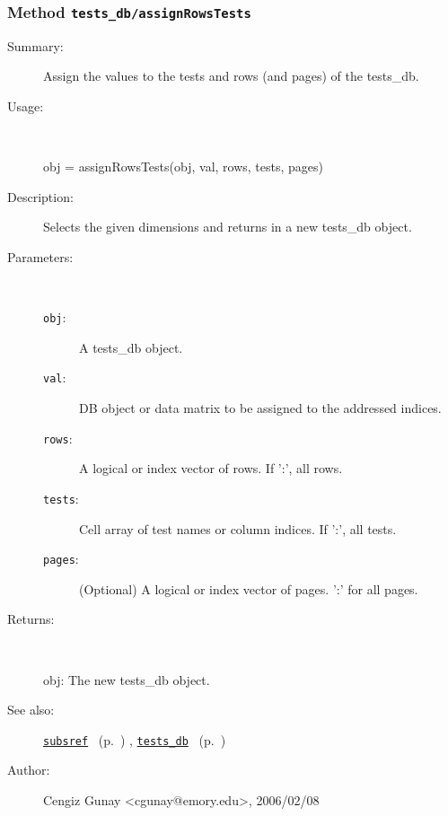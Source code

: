 \subsubsection[Method \texttt{assignRowsTests}]{Method \texttt{tests\_db/assignRowsTests}}%
%
\label{ref_tests_db__assignRowsTests}%
\hypertarget{ref_tests_db__assignRowsTests}{}%
\begin{description}
\item[Summary:]Assign the values to the tests and rows (and pages) of the tests\_db.
%
\item[Usage:]~%
\begin{lyxcode}%
obj = assignRowsTests(obj, val, rows, tests, pages)
%
\end{lyxcode}%
%
\item[Description:]%
Selects the given dimensions and returns in a new tests\_db object.
\item[Parameters:]~
\begin{description}%
\item[\texttt{obj}:]
 A tests\_db object.
\item[\texttt{val}:]
 DB object or data matrix to be assigned to the addressed indices.
\item[\texttt{rows}:]
 A logical or index vector of rows. If ':', all rows.
\item[\texttt{tests}:]
 Cell array of test names or column indices. If ':', all tests.
\item[\texttt{pages}:]
 (Optional) A logical or index vector of pages. ':' for all pages.
\end{description}%
%
\item[Returns:
]~

	obj: The new tests\_db object.
%
%
\item[See also:]%
\hyperlink{ref_subsref}{\texttt{subsref}}%
\ (p.~\pageref{ref_subsref})%
%
, \hyperlink{ref_tests_db}{\texttt{tests\_db}}%
\ (p.~\pageref{ref_tests_db})%
%
%
\item[Author:]%
Cengiz Gunay <cgunay@emory.edu>, 2006/02/08
%
\end{description}
\methodline%
